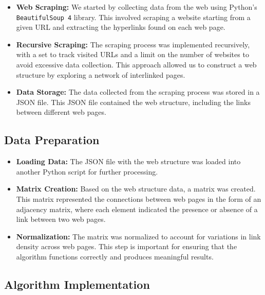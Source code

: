 \documentclass{article}
\begin{document}
\begin{itemize}
    \item \textbf{Web Scraping:} We started by collecting data from the web using Python's \texttt{BeautifulSoup 4} library. This involved scraping a website starting from a given URL and extracting the hyperlinks found on each web page.
    
    \item \textbf{Recursive Scraping:} The scraping process was implemented recursively, with a set to track visited URLs and a limit on the number of websites to avoid excessive data collection. This approach allowed us to construct a web structure by exploring a network of interlinked pages.
    
    \item \textbf{Data Storage:} The data collected from the scraping process was stored in a JSON file. This JSON file contained the web structure, including the links between different web pages.
\end{itemize}

\subsection{Data Preparation}

\begin{itemize}
    \item \textbf{Loading Data:} The JSON file with the web structure was loaded into another Python script for further processing.
    
    \item \textbf{Matrix Creation:} Based on the web structure data, a matrix was created. This matrix represented the connections between web pages in the form of an adjacency matrix, where each element indicated the presence or absence of a link between two web pages.
    
    \item \textbf{Normalization:} The matrix was normalized to account for variations in link density across web pages. This step is important for ensuring that the algorithm functions correctly and produces meaningful results.
\end{itemize}

\subsection{Algorithm Implementation}
\end{document}

